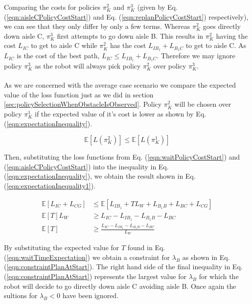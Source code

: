 \documentclass[a4paper,12pt]{article}
\begin{document}
			Comparing the costs for policies $\pi_{K}^{2}$ and $\pi_{K}^{3}$ (given by Eq. (\ref{eqn:aisleCPolicyCostStart}) and Eq. (\ref{eqn:replanPolicyCostStart}) respectively), we can see that they only differ by only a few terms. Whereas $\pi_{K}^{2}$ goes directly down aisle C, $\pi_{K}^{3}$ first attempts to go down aisle B. This results in $\pi_{K}^{2}$ having the cost $L_{IC}$ to get to aisle C while $\pi_{K}^{2}$ has the cost $L_{IB_1}+L_{B_1C}$ to get to aisle C. As $L_{IC}$ is the cost of the best path, $L_{IC} \leq L_{IB_1}+L_{B_1C}$. Therefore we may ignore policy $\pi_{K}^{3}$ as the robot will always pick policy $\pi_{K}^{2}$ over policy $\pi_{K}^{3}$.
			\\
			\\
			As we are concerned with the average case scenario we compare the expected value of the loss function just as we did in section \ref{sec:policySelectionWhenObstacleIsObserved}. Policy $\pi_{K}^{2}$ will be chosen over policy $\pi_{K}^{1}$ if the expected value of it's cost is lower as shown by Eq. (\ref{eqn:expectationInequality}).
			
			\begin{equation}
			\mathbb{E}\left[L\left(\pi_{K}^{2}\right)\right] \leq \mathbb{E}\left[L\left(\pi_{K}^{1}\right)\right]
			\label{eqn:expectationInequality}
			\end{equation}
			
			Then, substituting the loss functions from Eq. (\ref{eqn:waitPolicyCostStart}) and (\ref{eqn:aisleCPolicyCostStart}) into the inequality in Eq. (\ref{eqn:expectationInequality}), we obtain the result shown in Eq. (\ref{eqn:expectationInequality1}).
			
			\begin{equation}
			\begin{split}
			\mathbb{E}[L_{IC}+L_{CG}] &\leq \mathbb{E}[L_{IB_1}+TL_W + L_{B_1B}+L_{BC}+L_{CG}] \\
			\mathbb{E}[T]L_W &\geq L_{IC}-L_{IB_1}-L_{B_1B}-L_{BC}\\
			\mathbb{E}[T] &\geq \frac{L_{IC}-L_{IB_1}-L_{B_1B}-L_{BC}}{L_W}
			\end{split}
			\label{eqn:expectationInequality1}
			\end{equation}
			
			By substituting the expected value for $T$ found in Eq. (\ref{eqn:waitTimeExpectation}) we obtain a constraint for $\lambda_B$ as shown in Eq. (\ref{eqn:constraintPlanAtStart}). The right hand side of the final inequality in Eq. (\ref{eqn:constraintPlanAtStart}) represents the largest value for $\lambda_B$ for which the robot will decide to go directly down aisle C avoiding aisle B. Once again the sultions for $\lambda_B < 0$ have been ignored. 
			
\end{document}
